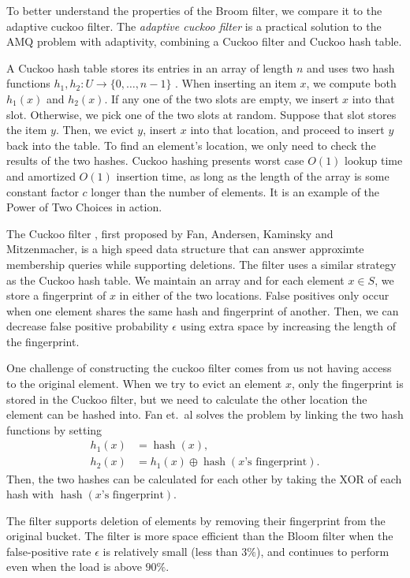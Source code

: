 \documentclass[../paper.tex]{subfiles}
\begin{document}
\newcommand{\on}{\operatorname}
To better understand the properties of the Broom filter, we compare it to the adaptive cuckoo filter.
The \emph{adaptive cuckoo filter} \cite{adaptive-cuckoo} is a practical solution to the AMQ problem with adaptivity, combining a Cuckoo filter and Cuckoo hash table.

A Cuckoo hash table stores its entries in an array of length $n$ and uses two hash functions $h_1,h_2:U\to \{0,\ldots,n-1\}$ \cite{prob-textbook}.
When inserting an item $x$, we compute both $h_1(x)$ and $h_2(x)$. If any one of the two slots are empty, we insert $x$ into that slot.
Otherwise, we pick one of the two slots at random. Suppose that slot stores the item $y$. Then, we evict $y$, insert $x$ into that location,
and proceed to insert $y$ back into the table. To find an element's location, we only need to check the results of the two hashes.
Cuckoo hashing presents worst case $O(1)$ lookup time and amortized $O(1)$ insertion time, as long as the length of the array is some constant factor $c$ longer
than the number of elements. It is an example of the Power of Two Choices in action.

The Cuckoo filter \cite{cuckoo-filter}, first proposed by Fan, Andersen, Kaminsky and Mitzenmacher, is a high speed data structure that can answer approximte membership queries while supporting deletions.
The filter uses a similar strategy as the Cuckoo hash table. We maintain an array and for each element $x\in S$, we store a fingerprint of $x$ in either of the two locations. False positives only occur when one element shares the same hash and fingerprint of another. Then, we can decrease false positive probability $\epsilon$ using extra space by increasing the length of the fingerprint.

One challenge of constructing the cuckoo filter comes from us not having access to the original element. When we try to evict an element $x$, only the fingerprint
is stored in the Cuckoo filter, but we need to calculate the other location the element can be hashed into. Fan et.\ al solves the problem by linking the two hash functions by setting \begin{align*}
    h_1(x)&=\on{hash}(x), \\ h_2(x)&=h_1(x)\oplus \on{hash}(x\text{'s fingerprint}).
\end{align*} Then, the two hashes can be calculated for each other by taking the XOR of each hash with $\on{hash}(x\text{'s fingerprint})$.

The filter supports deletion of elements by removing their fingerprint from the original bucket. The filter is more space efficient than the Bloom filter when the false-positive rate $\epsilon$ is relatively small (less than $3\%$), and continues to perform even when the load is above $90\%$.
\end{document}

